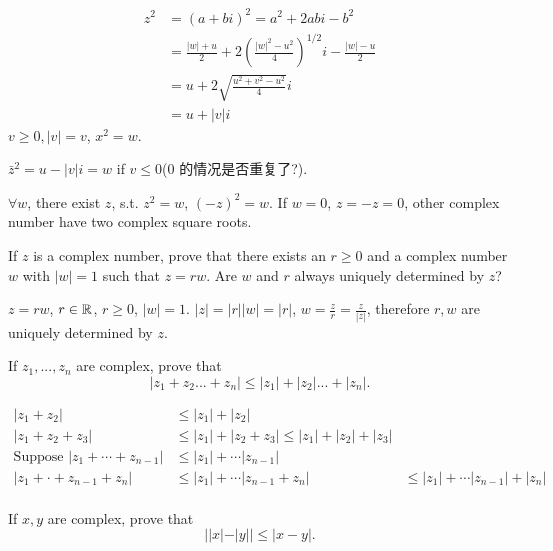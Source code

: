 \mySolve
\begin{align*}
    z^2 &= (a+bi)^2 = a^2 + 2abi - b^2 \\
    &= \frac{|w|+u}{2} + 2\left( \frac{|w|^2-u^2}{4} \right)^{1/2}i - \frac{|w|-u}{2}\\
    &= u + 2 \sqrt{\frac{u^2 + v^2 - u^2}{4}}i \\
    &= u + |v| i 
\end{align*}
$v \geq 0, |v| = v$, $x^2 = w$.

$\bar{z}^2 = u - |v| i = w$ if $v \leq 0$(0 的情况是否重复了?).

$\forall w$, there exist $z$, s.t. $z^2 = w$, $(-z)^2 = w$.
If $w = 0$, $z = -z = 0$, other complex number have two complex square roots.


\begin{myExercise}
    \label{ex:1.11}
    If $z$ is a complex number, prove that there exists an $r \geq 0$ and a complex number
    $w$ with $|w| = 1$ such that $z =rw$. Are $w$ and $r$ always uniquely determined by $z$?
\end{myExercise}

\mySolve 
$z = rw$, $r \in {\protect\mathbb R}$, $r \geq 0$, $|w| = 1$.
$|z| = |r||w| = |r|$, $w = \frac{z}{r} = \frac{z}{|z|}$,
therefore $r,w$ are uniquely determined by $z$.


\begin{myExercise}
    \label{ex:1.12}
    If $z_1 ,..., z_n$ are complex, prove that
    \begin{equation*}
        |z_1 + z_2 ...+ z_n| \leq 
        |z_1| + |z_2| ...+ |z_n|.
    \end{equation*}
\end{myExercise}

\mySolve 
\begin{align*}
    |z_1 + z_2| &\leq |z_1| + |z_2| \\
    |z_1 + z_2 + z_3| &\leq |z_1| + |z_2 + z_3| \leq |z_1| + |z_2| + |z_3| \\
    \text{Suppose } |z_1 + \cdots + z_{n-1}| &\leq |z_1| + \cdots |z_{n-1}| \\ 
    |z_1 + \cdot + z_{n-1} + z_n| &\leq |z_1| + \cdots |z_{n-1} + z_n| 
    &\leq |z_1| + \cdots |z_{n-1}| + |z_n| \\ 
\end{align*}


\begin{myExercise}
    \label{ex:1.13}
    If $x, y$ are complex, prove that
    \begin{equation*}
        ||x|-|y|| \leq |x-y|.
    \end{equation*}
\end{myExercise}

